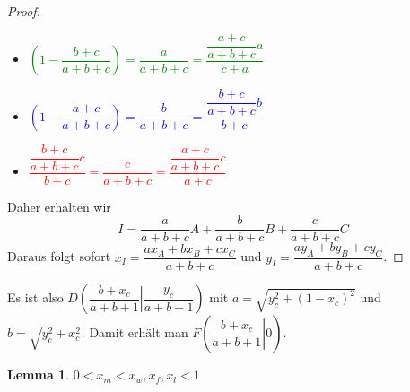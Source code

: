 \documentclass{article}
\newtheorem{lemma}{Lemma}
\begin{document}
\begin{proof}
   	\begin{itemize}
   		\item \textcolor{green}{$\left(1-\dfrac{b+c}{a+b+c}\right) = \dfrac{a}{a+b+c} = \dfrac{\dfrac{a+c}{a+b+c}a}{c+a}$}
   		\item \textcolor{blue}{$\left(1-\dfrac{a+c}{a+b+c}\right) = \dfrac{b}{a+b+c} = \dfrac{\dfrac{b+c}{a+b+c}b}{b+c}$}
   		\item \textcolor{red}{$\dfrac{\dfrac{b+c}{a+b+c}c}{b+c} = \dfrac{c}{a+b+c} = \dfrac{\dfrac{a+c}{a+b+c}c}{a+c}$}
   	\end{itemize}
   	Daher erhalten wir \[I = \dfrac{a}{a+b+c}A + \dfrac{b}{a+b+c}B+\dfrac{c}{a+b+c}C\]
   	Daraus folgt sofort $x_I = \dfrac{ax_{A}+bx_{B}+cx_{C}}{a+b+c}$ und $y_I = \dfrac {ay_{A}+by_{B}+cy_{C}}{a+b+c}$.
   \end{proof}
    Es ist also $D\left(\dfrac{b+x_c}{a+b+1}\left|\dfrac{y_c}{a+b+1}\right.\right)$ mit $a = \sqrt{y_c^2+(1-x_c)^2}$ und $b = \sqrt{y_c^2+x_c^2}$. Damit erhält man $F\left(\left.\dfrac{b+x_c}{a+b+1}\right|0\right)$.
    \iffalse
    \begin{lemma}
    	Die Punkte $A,B,C,D,F,M,L,T$ und $W$ sind unabhängig von der Wahl von $C$ stets paarweise verschieden.
    \end{lemma}
    \begin{proof}
    	Da $A$, $B$ und $C$ paarweise verschieden sind, kann auch der Inkreismittelpunkt $D$ auf keinen der drei Punkte fallen. Die Winkelhalbierende von $\angle ABC$ ist nur für $a=b$ senkrecht. Da $DF$ per Definition senkrecht ist, fallen $DF$ und $DW$, also $F$ und $W$ nur für $a=b$ zusammen. Das gleiche gilt für $CL$ und $CW$ und folglich $L$ und $W$; sowie für $CD$ und $CL$ und damit $F$ und $L$. $L$ und $M$ fallen auch nicht zusammen, da $x_\ell = x_c > 0.5 = x_m$. $M$ und $W$ sind ebenfalls verschieden, da $x_w = \frac{b}{a+b} > 0.5 = x_m$. Für $x_w>x_m$ ist auch $x_f> x_m$. Wir haben also gezeigt, dass $L, W, M$ und $F$ alle paarweise verschieden sind. Alle 4 Punkte liegen zwischen $A$ und $B$ und haben die $y$-Koordinate 0, daher sind sie auch von allen anderen Punkten verschieden.
    	Die $y$-Koordinate von $T$ ist per Definition $>0$, da der Radius von $k$ $>0$ ist, gilt auch $T\neq D$. Da $k$ der Inkreis ist und $T$ ein Punkt auf dem Inkreis ist $T$ auch von allen Eckpunkten verschieden.
    \end{proof}
	\noindent Daraus folgt unmittelbar, dass alle Streckenlängen zwischen zwei dieser Punkte größer 0 sind.
	\fi
	\begin{lemma}
		$0 < x_m < x_w, x_f, x_l < 1$
	\end{lemma}
\end{document}
